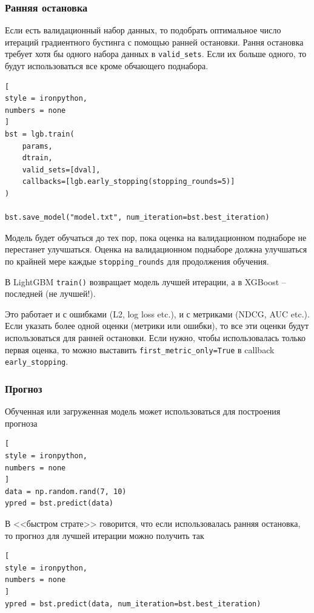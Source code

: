 \documentclass[%
	11pt,
	a4paper,
	utf8,
		]{article}
\begin{document}
\subsubsection{Ранняя остановка}

Если есть валидационный набор данных, то подобрать оптимальное число итераций градиентного бустинга с помощью ранней остановки. Рання остановка требует хотя бы одного набора данных в \verb|valid_sets|. Если их больше одного, то будут использоваться все кроме обчающего поднабора.
\begin{lstlisting}[
style = ironpython,
numbers = none
]
bst = lgb.train(
    params,
    dtrain,
    valid_sets=[dval],
    callbacks=[lgb.early_stopping(stopping_rounds=5)]
)

bst.save_model("model.txt", num_iteration=bst.best_iteration)
\end{lstlisting}

Модель будет обучаться до тех пор, пока оценка на валидационном поднаборе не перестанет улучшаться. Оценка на валидационном поднаборе должна улучшаться по крайней мере каждые \verb|stopping_rounds| для продолжения обучения.

В LightGBM \verb|train()| возвращает модель лучшей итерации, а в XGBoost -- последней (не лучшей!).

Это работает и с ошибками (L2, log loss etc.), и с метриками (NDCG, AUC etc.). Если указать более одной оценки (метрики или ошибки), то все эти оценки будут использоваться для ранней остановки. Если нужно, чтобы использовалась только первая оценка, то можно выставить \verb|first_metric_only=True| в callback \verb|early_stopping|.

\subsubsection{Прогноз}

Обученная или загруженная модель может использоваться для построения прогноза
\begin{lstlisting}[
style = ironpython,
numbers = none
]
data = np.random.rand(7, 10)
ypred = bst.predict(data)
\end{lstlisting}

В <<быстром страте>> говорится, что если использовалась ранняя остановка, то прогноз для лучшей итерации можно получить так
\begin{lstlisting}[
style = ironpython,
numbers = none
]
ypred = bst.predict(data, num_iteration=bst.best_iteration)
\end{lstlisting}
\end{document}
